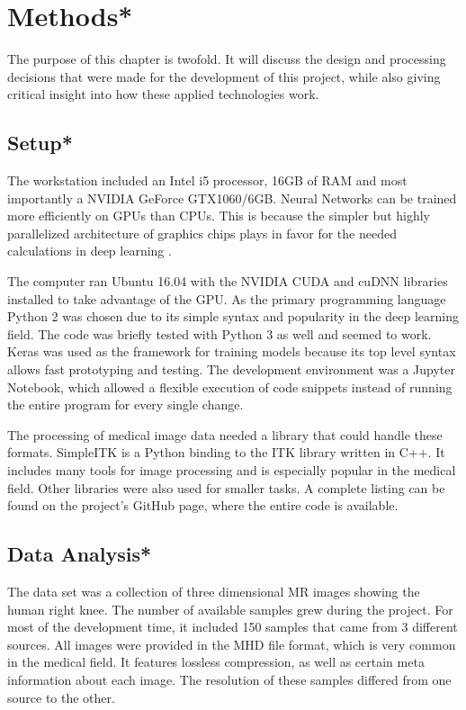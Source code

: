 \section{Methods*}

The purpose of this chapter is twofold. It will discuss the design and processing decisions that were made for the development of this project, while also giving critical insight into how these applied technologies work.

\subsection{Setup*}

The workstation included an Intel i5 processor, 16GB of RAM and most importantly a NVIDIA GeForce GTX1060/6GB. Neural Networks can be trained more efficiently on GPUs than CPUs. This is because the simpler but highly parallelized architecture of graphics chips plays in favor for the needed calculations in deep learning \cite{NVIDIA}.

The computer ran Ubuntu 16.04 with the NVIDIA CUDA and cuDNN libraries installed to take advantage of the GPU. As the primary programming language Python 2 was chosen due to its simple syntax and popularity in the deep learning field. The code was briefly tested with Python 3 as well and seemed to work. Keras was used as the framework for training models because its top level syntax allows fast prototyping and testing. The development environment was a Jupyter Notebook, which allowed a flexible execution of code snippets instead of running the entire program for every single change.

The processing of medical image data needed a library that could handle these formats. SimpleITK is a Python binding to the ITK library written in C++. It includes many tools for image processing and is especially popular in the medical field. Other libraries were also used for smaller tasks. A complete listing can be found on the project's GitHub page, where the entire code is available.

\subsection{Data Analysis*}

The data set was a collection of three dimensional MR images showing the human right knee. The number of available samples grew during the project. For most of the development time, it included 150 samples that came from 3 different sources. All images were provided in the MHD file format, which is very common in the medical field. It features lossless compression, as well as certain meta information about each image. The resolution of these samples differed from one source to the other.

